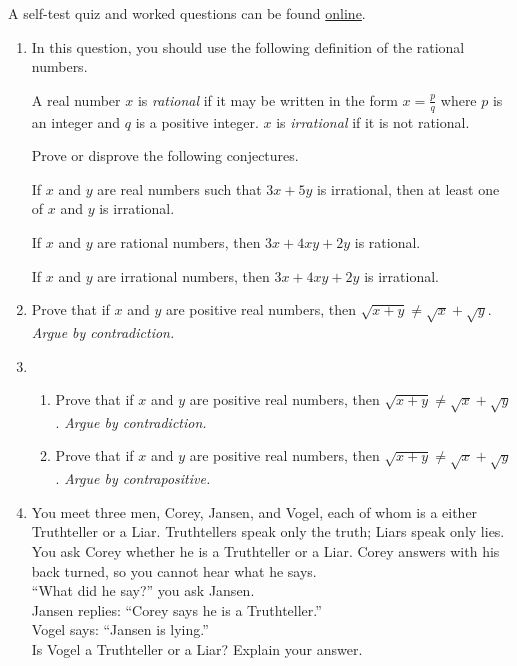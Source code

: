 \begin{exercises}{}{}
	A self-test quiz and worked questions can be found \href{http://www.math.uci.edu/~ndonalds/math13/selftest/2-4-proofs2.html}{online}.

\begin{enumerate}
	\item In this question, you should use the following definition of the rational numbers.
		\begin{defn*}{}{}
  	A real number $x$ is \emph{rational} if it may be written in the form $x=\frac pq$ where $p$ is an integer and $q$ is a positive integer. $x$ is \emph{irrational} if it is not rational.
  	\end{defn*}
  	Prove or disprove the following conjectures.
  	\begin{conj*}{1}{}
			If $x$ and $y$ are real numbers such that $3x+5y$ is irrational, then at least one of $x$ and $y$ is irrational.
		\end{conj*}
  	\begin{conj*}{2}{}
			If $x$ and $y$ are rational numbers, then $3x+4xy+2y$ is rational.
		\end{conj*}
  	\begin{conj*}{3}{}
			If $x$ and $y$ are irrational numbers, then $3x+4xy+2y$ is irrational.
		\end{conj*}
  
	\item Prove that if $x$ and $y$ are positive real numbers, then $\sqrt{x+y}\neq\sqrt{x}+\sqrt{y}$. \emph{Argue by contradiction.}
	
	    	\item \begin{enumerate} \item Prove that if $x$ and $y$ are positive real numbers, then $\sqrt{x+y}\neq\sqrt{x}+\sqrt{y}$. \emph{Argue by contradiction.}
     \item Prove that if $x$ and $y$ are positive real numbers, then $\sqrt{x+y}\neq\sqrt{x}+\sqrt{y}$. \emph{Argue by contrapositive.}
\end{enumerate}


  \item You meet three men, Corey, Jansen, and Vogel, each of whom is a either Truthteller or a Liar. Truthtellers speak only the truth; Liars speak only lies. You ask Corey whether he is a Truthteller or a Liar. Corey answers with his back turned, so you cannot hear what he says.\\[5pt]
``What did he say?'' you ask Jansen.\\[5pt]
Jansen replies: ``Corey says he is a Truthteller.''\\[5pt]
Vogel says: ``Jansen is lying.''\\[5pt]
Is Vogel a Truthteller or a Liar? Explain your answer.


\end{enumerate}
\end{exercises}
